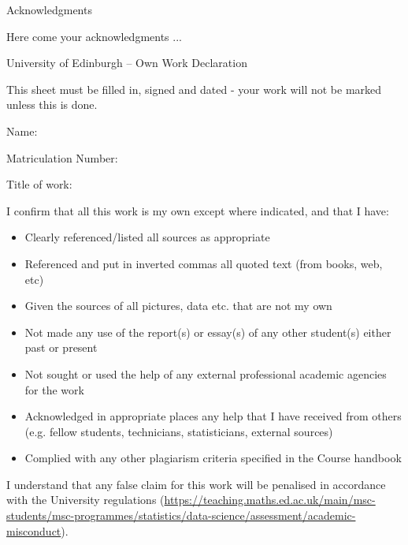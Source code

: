 \documentclass[
  11pt,
  twoside,
  11pt]{article}
\numberwithin{Theorem}{section}
\numberwithin{Definition}{section}
\numberwithin{Lemma}{section}
\numberwithin{Algorithm}{section}
\numberwithin{equation}{section}
\newcommand{\dottedline}[1]{\makebox[#1]{.\dotfill}}
\begin{document}
\clearpage

\begin{center}
\Large{Acknowledgments}
\end{center}

Here come your acknowledgments ...

\clearpage

\begin{center}
\Large{University of Edinburgh – Own Work Declaration}
\end{center}


This sheet must be filled in, signed and dated - your work will not be marked unless this is done.
\vspace{1cm}

Name: \dottedline{8cm}

Matriculation Number: \dottedline{6cm}

Title of work: \dottedline{8cm}

\vspace{1cm}

I confirm that all this work is my own except where indicated, and that I have:
\begin{itemize}
\item   Clearly referenced/listed all sources as appropriate                    
\item   Referenced and put in inverted commas all quoted text (from books, web, etc)    
\item   Given the sources of all pictures, data etc. that are not my own                
\item   Not made any use of the report(s) or essay(s) of any other student(s) either past   
or present  
\item   Not sought or used the help of any external professional academic agencies for the work
\item   Acknowledged in appropriate places any help that I have received from others    (e.g. fellow students, technicians, statisticians, external sources)
\item   Complied with any other plagiarism criteria specified in the Course handbook
\end{itemize}

I understand that any false claim for this work will be penalised in accordance with
the University regulations  (\url{https://teaching.maths.ed.ac.uk/main/msc-students/msc-programmes/statistics/data-science/assessment/academic-misconduct}).                                
\end{document}
